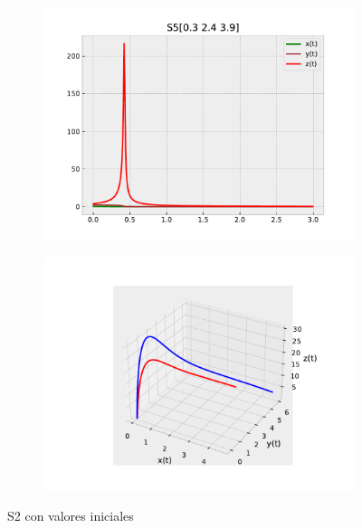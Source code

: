 \documentclass{wscpaperproc}
\theoremstyle{wsc}
\begin{document}
\begin{figure}[h]
	\centering
	\begin{subfigure}[b]{0.5\textwidth}
		\centering
		\includegraphics[width=\textwidth]{Simulations/S5[0.3 2.4 3.9].pdf}
	
		\label{fig:comparativa91}
	\end{subfigure}%
	\begin{subfigure}[b]{0.5\textwidth}
		\centering
		\includegraphics[width=\textwidth]{Simulations/S13d.pdf}
		\label{fig:comparativa92}
	\end{subfigure}
	\caption{S2 con valores iniciales}

	\label{fig:comparacion13}
\end{figure}
\end{document}
